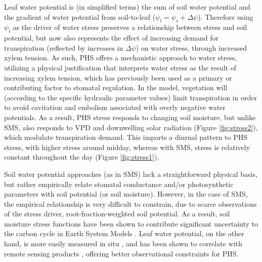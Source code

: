 \documentclass[draft,linenumbers]{agujournal}
\begin{document}
    Leaf water potential is (in simplified terms) the sum of soil water potential and the gradient of water potential from soil-to-leaf ($\psi_l=\psi_s+\Delta\psi$).
    Therefore using $\psi_l$ as the driver of water stress preserves a relationship between stress and soil potential, but now also represents the effect of increasing demand for transpiration (reflected by increases in $\Delta\psi$) on water stress, through increased xylem tension.
    As such, PHS offers a mechanistic approach to water stress, utilizing a physical justification that interprets water stress as the result of increasing xylem tension, which has previously been used as a primary \citep{sperry2017} or contributing \citep{novick2016a} factor to stomatal regulation.
    In the model, vegetation will (according to the specific hydraulic parameter values) limit transpiration in order to avoid cavitation and embolism associated with overly negative water potentials.
    As a result, PHS stress responds to changing soil moisture, but unlike SMS, also responds to VPD and downwelling solar radiation (Figure \ref{fig:stress2}), which modulate transpiration demand.
    This imparts a diurnal pattern to PHS stress, with higher stress around midday, whereas with SMS, stress is relatively constant throughout the day (Figure \ref{fig:stress1}).
   
    Soil water potential approaches (as in SMS) lack a straightforward physical basis, but rather empirically relate stomatal conductance and/or photosynthetic parameters with soil potential (or soil moisture).
    However, in the case of SMS, the empirical relationship is very difficult to constrain, due to scarce observations of the stress driver, root-fraction-weighted soil potential.
    As a result, soil moisture stress functions have been shown to contribute significant uncertainty to the carbon cycle in Earth System Models \citep{trugman2018}.
    Leaf water potential, on the other hand, is more easily measured in situ \citep{boyer1967}, and has been shown to correlate with remote sensing products \citep{momen2017}, offering better observational constraints for PHS.
\end{document}
